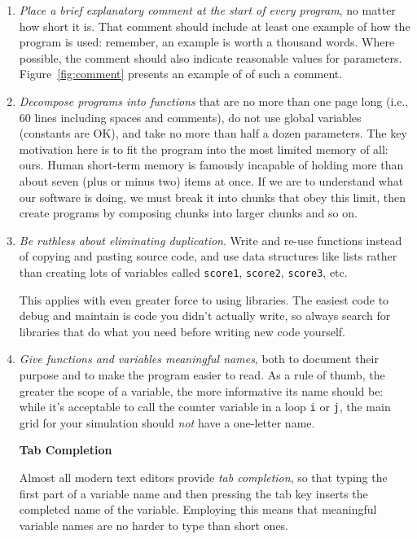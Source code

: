 \documentclass[10pt]{article}
\newcommand{\recommend}[1]{\textit{#1}}
\begin{document}
\begin{enumerate}

\item  
  \recommend{Place a brief explanatory comment at the start of
    every program}, no matter how short it is. That comment should
  include at least one example of how the program is used: remember, an
  example is worth a thousand words. Where possible, the comment should
  also indicate reasonable values for parameters.  Figure~\ref{fig:comment}
  presents an example of of such a comment.

\item
  \recommend{Decompose programs into functions} that
  are no more than one page long (i.e., 60 lines including spaces and comments),
  do not use global variables (constants are OK),
  and take no more than half a dozen parameters.
  The key motivation here is to fit the program into the most limited
  memory of all: ours. Human short-term memory is famously incapable of
  holding more than about seven (plus or minus two) items at once. If we
  are to understand what our software is doing, we must break it into
  chunks that obey this limit, then create programs by composing chunks
  into larger chunks and so on.

\item
  \recommend{Be ruthless about eliminating duplication}. Write and
  re-use functions instead of copying and pasting source code, and use
  data structures like lists rather than creating lots of variables called
  \texttt{score1}, \texttt{score2}, \texttt{score3}, etc.

  This applies with even greater force to using libraries. The easiest code
  to debug and maintain is code you didn't actually write, so
  always search for libraries that do what you need before writing
  new code yourself.

\item
  \recommend{Give functions and variables meaningful names}, both to
  document their purpose and to make the program easier to read. As a rule
  of thumb, the greater the scope of a variable, the more informative its
  name should be: while it's acceptable to call the counter variable in a
  loop \texttt{i} or \texttt{j}, the main grid for your simulation should
  \emph{not} have a one-letter name.

  \begin{framed}
    \noindent \textbf{Tab Completion}

    Almost all modern text editors provide \emph{tab completion},
    so that typing the first part of a variable name and then pressing the tab key
    inserts the completed name of the variable.
    Employing this means that meaningful variable names are no harder to type than short ones.


\end{framed}
\end{enumerate}
\end{document}
